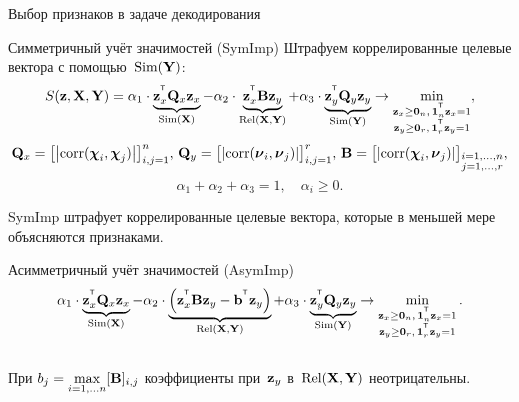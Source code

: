 \documentclass[10pt]{beamer}
\begin{document}
\begin{frame}{Выбор признаков в задаче декодирования}
	\begin{block}{Симметричный учёт значимостей (SymImp)}
	Штрафуем коррелированные целевые вектора с помощью~$\text{Sim} (\bY)$:
	\[
	S(\bz, \bX, \bY) = \alpha_1 \cdot \underbrace{\bz_x^{\T} \bQ_x \bz_x}_{\text{Sim}(\bX)} - \alpha_2 \cdot \underbrace{\bz_x^{\T} \bB \bz_y}_{\text{Rel}(\bX, \bY)} + \alpha_3 \cdot \underbrace{\bz_y^{\T} \bQ_y \bz_y}_{\text{Sim}(\bY)} \rightarrow \min_{\substack{\bz_x \geq \bZero_n, \, \bOne_n^{\T}\bz_x=1 \\ \bz_y \geq \bZero_r, \, \bOne_r^{\T}\bz_y=1}},
	\]
	\[
	\bQ_x = \bigl[ \left| \text{corr}(\bchi_i, \bchi_j) \right| \bigr]_{i,j=1}^n, \,
	\bQ_y = \bigl[ \left| \text{corr}(\bnu_i, \bnu_j) \right| \bigr]_{i,j=1}^r, \,
	\bB =  \bigl[ \left| \text{corr}(\bchi_i, \bnu_j) \right| \bigr]_{\substack{i=1, \dots, n \\ j=1, \dots, r}},
	\]
	\[
	\alpha_1 + \alpha_2 + \alpha_3 = 1, \quad \alpha_i \geq 0.
	\] 
	\end{block}
	SymImp штрафует коррелированные целевые вектора, которые в меньшей мере объясняются признаками. 
		
	\begin{block}{Асимметричный учёт значимостей (AsymImp)}
		\vspace{-0.2cm}
		\begin{equation*}
		\alpha_1 \cdot \underbrace{\bz_x^{\T} \bQ_x \bz_x}_{\text{Sim}(\bX)} - \alpha_2 \cdot  \underbrace{\left(\bz_x^{\T} \bB \bz_y - \bb^{\T} \bz_y \right) }_{\text{Rel}(\bX, \bY)} + \alpha_3 \cdot \underbrace{\bz_y^{\T} \bQ_y \bz_y}_{\text{Sim}(\bY)} \rightarrow \min_{\substack{\bz_x \geq \bZero_n, \, \bOne_n^{\T}\bz_x=1 \\ \bz_y \geq \bZero_r, \, \bOne_r^{\T}\bz_y=1}}.
		\end{equation*}
		\vspace{-0.4cm} \\
		При $b_j = \max\limits_{i=1, \dots n} [\bB]_{i, j}$ коэффициенты при~$\bz_y$ в~$\text{Rel}(\bX, \bY)$ неотрицательны.
	\end{block}
\end{frame}
\end{document}
